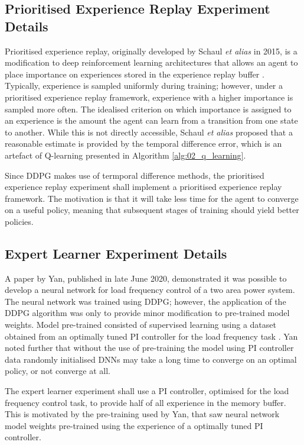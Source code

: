 \subsection{Prioritised Experience Replay Experiment Details}
Prioritised experience replay, originally developed by Schaul \textit{et alias} in 2015, is a modification to deep reinforcement learning architectures that allows an agent to place importance on experiences stored in the experience replay buffer \cite{Schaul2015}. Typically, experience is sampled uniformly during training; however, under a prioritised experience replay framework, experience with a higher importance is sampled more often. The idealised criterion on which importance is assigned to an experience is the amount the agent can learn from a transition from one state to another. While this is not directly accessible, Schaul \textit{et alias} proposed that a reasonable estimate is provided by the temporal difference error, which is an artefact of Q-learning presented in Algorithm \ref{alg:02_q_learning}.

Since DDPG makes use of termporal difference methods, the prioritised experience replay experiment shall implement a prioritised experience replay framework. The motivation is that it will take less time for the agent to converge on a useful policy, meaning that subsequent stages of training should yield better policies.

\subsection{Expert Learner Experiment Details}
A paper by Yan, published in late June 2020, demonstrated it was possible to develop a neural network for load frequency control of a two area power system. The neural network was trained using DDPG; however, the application of the DDPG algorithm was only to provide minor modification to pre-trained model weights. Model pre-trained consisted of supervised learning using a dataset obtained from an optimally tuned PI controller for the load frequency task \cite{Yan2020}. Yan noted further that without the use of pre-training the model using PI controller data randomly initialised DNNs may take a long time to converge on an optimal policy, or not converge at all.

The expert learner experiment shall use a PI controller, optimised for the load frequency control task, to provide half of all experience in the memory buffer. This is motivated by the pre-training used by Yan, that saw neural network model weights pre-trained using the experience of a optimally tuned PI controller.


